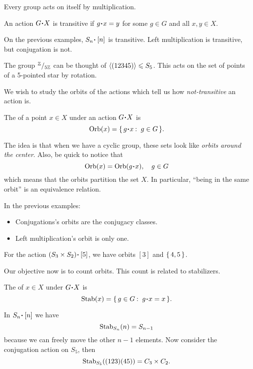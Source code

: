 \documentclass[12pt]{memoir}
\begin{document}
Every group acts on itself by multiplication. 

\begin{Def}
    An action $G\. X$ is transitive if $g\.x=y$ for some $g\in G$ and all $x,y\in X$.
\end{Def}

On the previous examples, $S_n\.\bonj{n}$ is transitive. Left multiplication is transitive, but conjugation is not.

\begin{Ex}
    The group $\quot{\bZ}{5\bZ}$ can be thought of $\left\langle (12345)\right\rangle\leqslant S_5$. This acts on the set of points of a 5-pointed star by rotation.
\end{Ex}

We wish to study the orbits of the actions which tell us how \emph{not-transitive} an action is.

\begin{Def}
    The  of a point $x\in X$ under an action $G\.X$ is 
    $$\Orb(x)=\set{g\.x\:\ g\in G}.$$
\end{Def}

The idea is that when we have a cyclic group, these sets look like \emph{orbits around the center}. Also, be quick to notice that 
$$\Orb(x)=\Orb(g\. x),\quad g\in G$$
which means that the orbits partition the set $X$. In particular, ``being in the same orbit'' is an equivalence relation.\par 
In the previous examples:
\vspace*{-0.4em}
    \begin{itemize}
        \itemsep=-0.4em
        \item Conjugations's orbits are the conjugacy classes.
        \item Left multiplication's orbit is only one. 
    \end{itemize}

\begin{Ex}
    For the action $(S_3\x S_2)\.\bonj{5}$, we have orbits $[3]$ and $\{\,4,5\,\}$.
\end{Ex}

Our objective now is to count orbits. This count is related to stabilizers. 

\begin{Def}
    The  of $x\in X$ under $G\.X$ is 
    $$\Stab(x)=\set{g\in G\:\ g\.x=x}.$$
\end{Def}

\begin{Ex}
    In $S_n\.\bonj{n}$ we have
    $$\operatorname{Stab}_{S_n}(n)=S_{n-1}$$
    because we can freely move the other $n-1$ elements. Now consider the conjugation action on $S_5$, then 
    $$\operatorname{Stab}_{S_5}((123)(45))=C_3\times C_2.$$
\end{Ex}
\end{document}
